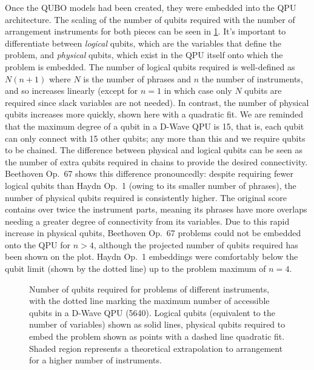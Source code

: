 \documentclass[12pt]{article}
\theoremstyle{definition}
\begin{document}
Once the QUBO models had been created, they were embedded into the QPU architecture. The scaling of the number of qubits required with the number of arrangement instruments for both pieces can be seen in \cref{fig:qubits}. It's important to differentiate between \emph{logical} qubits, which are the variables that define the problem, and \emph{physical} qubits, which exist in the QPU itself onto which the problem is embedded. The number of logical qubits required is well-defined as $N(n+1)$ where $N$ is the number of phrases and $n$ the number of instruments, and so increases linearly (except for $n=1$ in which case only $N$ qubits are required since slack variables are not needed). In contrast, the number of physical qubits increases more quickly, shown here with a quadratic fit. We are reminded that the maximum degree of a qubit in a D-Wave QPU is \num{15}, that is, each qubit can only connect with \num{15} other qubits; any more than this and we require qubits to be chained. The difference between physical and logical qubits can be seen as the number of extra qubits required in chains to provide the desired connectivity. Beethoven Op.\ 67 shows this difference pronouncedly: despite requiring fewer logical qubits than Haydn Op.\ 1 (owing to its smaller number of phrases), the number of physical qubits required is consistently higher. The original score contains over twice the instrument parts, meaning its phrases have more overlaps needing a greater degree of connectivity from its variables. Due to this rapid increase in physical qubits, Beethoven Op.\ 67 problems could not be embedded onto the QPU for $n>4$, although the projected number of qubits required has been shown on the plot. Haydn Op.\ 1 embeddings were comfortably below the qubit limit (shown by the dotted line) up to the problem maximum of $n=4$.

\begin{figure}
    \centering\footnotesize
    
    \caption[Number of qubits required for problems of different instruments.]{Number of qubits required for problems of different instruments, with the dotted line marking the maximum number of accessible qubits in a D-Wave QPU (\num{5640}). Logical qubits (equivalent to the number of variables) shown as solid lines, physical qubits required to embed the problem shown as points with a dashed line quadratic fit. Shaded region represents a theoretical extrapolation to arrangement for a higher number of instruments.}
    \label{fig:qubits}
\end{figure}
\end{document}
